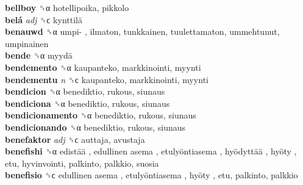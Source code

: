 \textbf{bellboy} ␝α  hotellipoika, pikkolo  \\
\textbf{belá} \emph{adj}  ␝ϲ   kynttilä   \\
\textbf{benauwd} ␝α   umpi- , ilmaton, tunkkainen, tuulettamaton, ummehtunut, umpinainen  \\
\textbf{bende} ␝α   myydä   \\
\textbf{bendemento} ␝α  kaupanteko, markkinointi, myynti  \\
\textbf{bendementu} \emph{n}  ␝ϲ  kaupanteko, markkinointi, myynti  \\
\textbf{bendicion} ␝α  benediktio, rukous, siunaus  \\
\textbf{bendiciona} ␝α  benediktio, rukous, siunaus  \\
\textbf{bendicionamento} ␝α  benediktio, rukous, siunaus  \\
\textbf{bendicionando} ␝α  benediktio, rukous, siunaus  \\
\textbf{benefaktor} \emph{adj}  ␝ϲ  auttaja, avustaja  \\
\textbf{benefishi} ␝α   edistää ,  edullinen asema ,  etulyöntiasema ,  hyödyttää ,  hyöty , etu, hyvinvointi, palkinto, palkkio, suosia  \\
\textbf{benefisio} ␝ϲ   edullinen asema ,  etulyöntiasema ,  hyöty , etu, palkinto, palkkio  \\
